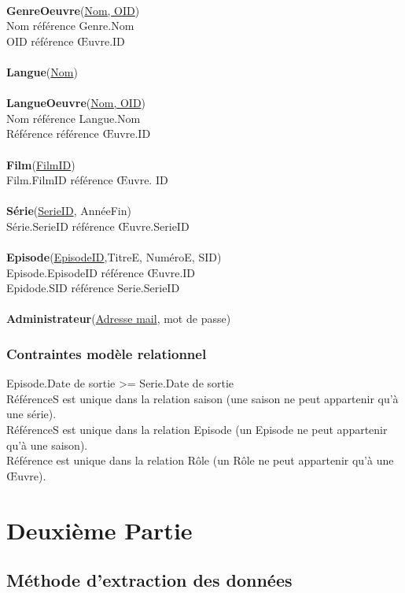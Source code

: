 \documentclass[10pt,a4paper]{article}
\begin{document}
\\
\textbf{GenreOeuvre}(\underline{Nom, OID})
\\
		Nom référence Genre.Nom
    \\
		OID référence Œuvre.ID
\\
\\
\textbf{Langue}(\underline{Nom})
\\
\\
\textbf{LangueOeuvre}(\underline{Nom, OID})
\\
	Nom référence Langue.Nom
    \\
	Référence référence Œuvre.ID
\\
\\
\textbf{Film}(\underline{FilmID})
\\
	Film.FilmID référence Œuvre. ID
\\
\\
\textbf{Série}(\underline{SerieID}, AnnéeFin)
\\
	Série.SerieID référence Œuvre.SerieID
\\
\\
\textbf{Episode}(\underline{EpisodeID},TitreE, NuméroE, SID)
\\
		Episode.EpisodeID référence Œuvre.ID
        \\
		Epidode.SID référence Serie.SerieID
\\
\\
\textbf{Administrateur}(\underline{Adresse mail}, mot de passe)
\subsubsection{Contraintes modèle relationnel}
\noindent Episode.Date de sortie >= Serie.Date de sortie \\
RéférenceS est unique dans la relation saison (une saison ne peut appartenir qu’à une série). \\
RéférenceS est unique dans la relation Episode (un Episode ne peut appartenir qu’à une saison). \\
Référence est unique dans la relation Rôle (un Rôle ne peut appartenir qu’à une Œuvre).

\newpage
\section{Deuxième Partie}\label{deuxieme partie}

\subsection{Méthode d'extraction des données}
\end{document}
